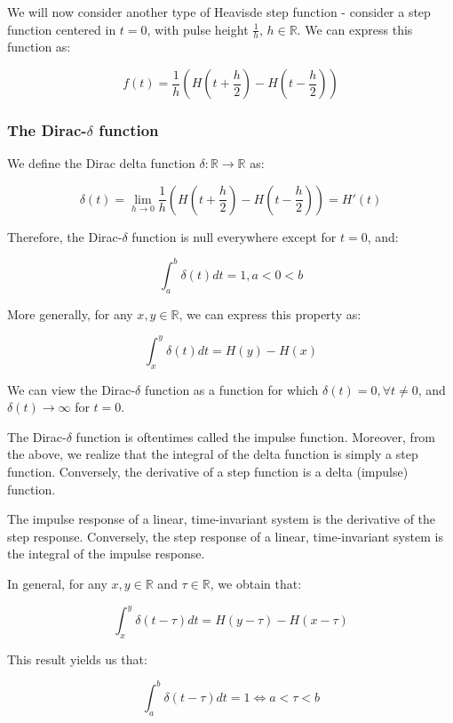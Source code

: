 \documentclass[12pt]{article}
\begin{document}
We will now consider another type of Heavisde step function - consider a step function centered in $t = 0$, with pulse height $\frac{1}{h}$, $h \in \mathbb{R}$. We can express this function as:

\[ f(t) = \frac{1}{h}\left(H\left(t + \frac{h}{2}\right) - H\left(t - \frac{h}{2}\right)\right) \]

\subsubsection{The Dirac-$\delta$ function}

\begin{definition}
    We define the Dirac delta function $\delta : \mathbb{R} \to \mathbb{R}$ as:

    \[ \delta(t) = \lim_{h \to 0} \frac{1}{h}\left(H\left(t + \frac{h}{2}\right) - H\left(t - \frac{h}{2}\right)\right) = H'(t)\]

    Therefore, the Dirac-$\delta$ function is null everywhere except for $t = 0$, and:

    \[ \int_a^b \delta(t)dt = 1, a < 0 < b \]

    More generally, for any $x, y \in \mathbb{R}$, we can express this property as:

    \[ \int_x^y \delta(t)dt = H(y) - H(x) \]

    We can view the Dirac-$\delta$ function as a function for which $\delta(t) = 0, \forall t \neq 0$, and $\delta(t) \to \infty$ for $t = 0$.
\end{definition}

The Dirac-$\delta$ function is oftentimes called the impulse function. Moreover, from the above, we realize that the integral of the delta function is simply a step function. Conversely, the derivative of a step function is a delta (impulse) function.

\begin{proposition}
    The impulse response of a linear, time-invariant system is the derivative of the step response. Conversely, the step response of a linear, time-invariant system is the integral of the impulse response.
\end{proposition}

\begin{theorem}
    In general, for any $x, y \in \mathbb{R}$ and $\tau \in \mathbb{R}$, we obtain that:

    \[ \int_x^y \delta(t - \tau)dt = H(y - \tau) - H(x - \tau) \]

    This result yields us that:

    \[ \int_a^b \delta(t - \tau)dt = 1 \iff a < \tau < b \]
\end{theorem}
\end{document}
